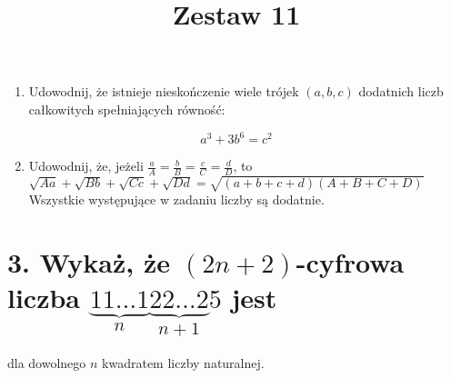 \documentclass[10pt]{article}
\title{Zestaw 11 }
\author{}
\date{}
\begin{document}
\maketitle
\begin{enumerate}
  \item Udowodnij, że istnieje nieskończenie wiele trójek \((a, b, c)\) dodatnich liczb całkowitych spełniających równość:
\end{enumerate}

\[
a^{3}+3 b^{6}=c^{2}
\]

\begin{enumerate}
  \setcounter{enumi}{1}
  \item Udowodnij, że, jeżeli \(\frac{a}{A}=\frac{b}{B}=\frac{c}{C}=\frac{d}{D}\), to\\
\(\sqrt{A a}+\sqrt{B b}+\sqrt{C c}+\sqrt{D d}=\sqrt{(a+b+c+d)(A+B+C+D)}\) Wszystkie występujące w zadaniu liczby są dodatnie.
\end{enumerate}

\section*{3. Wykaż, że \((2 n+2)\)-cyfrowa liczba \(\underbrace{11 \ldots 1}_{n} \underbrace{22 \ldots 2}_{n+1} 5\) jest}
dla dowolnego \(n\) kwadratem liczby naturalnej.
\end{document}
